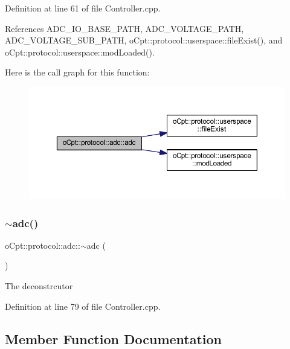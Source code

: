 Definition at line 61 of file Controller.\+cpp.



References A\+D\+C\+\_\+\+I\+O\+\_\+\+B\+A\+S\+E\+\_\+\+P\+A\+TH, A\+D\+C\+\_\+\+V\+O\+L\+T\+A\+G\+E\+\_\+\+P\+A\+TH, A\+D\+C\+\_\+\+V\+O\+L\+T\+A\+G\+E\+\_\+\+S\+U\+B\+\_\+\+P\+A\+TH, o\+Cpt\+::protocol\+::userspace\+::file\+Exist(), and o\+Cpt\+::protocol\+::userspace\+::mod\+Loaded().

Here is the call graph for this function\+:\nopagebreak
\begin{figure}[H]
\begin{center}
\leavevmode
\includegraphics[width=350pt]{classo_cpt_1_1protocol_1_1adc_aec27fd40080992220a7b641adcdfe9f9_cgraph}
\end{center}
\end{figure}
\hypertarget{classo_cpt_1_1protocol_1_1adc_ae61f97f81f6d76d5fc5fd783f49464ee}{}\label{classo_cpt_1_1protocol_1_1adc_ae61f97f81f6d76d5fc5fd783f49464ee} 
\subsubsection{\texorpdfstring{$\sim$adc()}{~adc()}}
{\footnotesize\ttfamily o\+Cpt\+::protocol\+::adc\+::$\sim$adc (\begin{DoxyParamCaption}{ }\end{DoxyParamCaption})\hspace{0.3cm}{\ttfamily [virtual]}}

The deconstrcutor 

Definition at line 79 of file Controller.\+cpp.



\subsection{Member Function Documentation}
\hypertarget{classo_cpt_1_1protocol_1_1adc_ae5ff90755d50ef617e9c00d704a88f52}{}\label{classo_cpt_1_1protocol_1_1adc_ae5ff90755d50ef617e9c00d704a88f52} 
